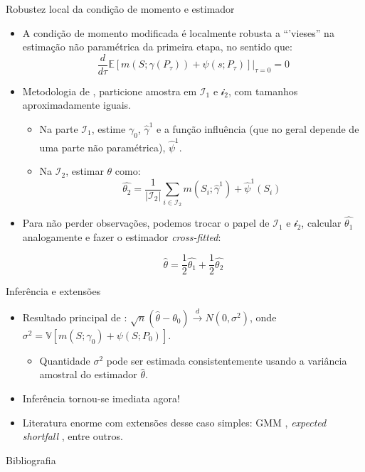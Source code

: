 \documentclass[11pt]{beamer}
\begin{document}
\begin{frame}{Robustez local da condição de momento e estimador}
\begin{itemize}
	\item A condição de momento modificada é localmente robusta a ``'vieses'' na estimação não paramétrica da primeira etapa, no sentido que:
	$$\frac{d}{d \tau} \mathbb{E}[m(S;\gamma(P_{\tau})) + \psi(s;P_{\tau})]\Big|_{\tau=0} = 0$$
	\item Metodologia de \cite{Chernozhukov2018}, particione amostra em $\mathcal{I}_1$ e $\mathcal{i}_2$, com tamanhos aproximadamente iguais.
	\begin{itemize}
		\item Na parte $\mathcal{I}_1$, estime $\gamma_0$, $\hat{\gamma}^1$ e a função influência (que no geral depende de uma parte não paramétrica), $\hat{\psi}^1$.
		\item Na $\mathcal{I}_2$, estimar $\theta$ como:
		\begin{equation}
			\hat{\theta_2} = \frac{1}{|\mathcal{I}_2|}\sum_{i\in \mathcal{I}_2} m(S_i;\hat{\gamma}^1) + \hat{\psi}^1(S_i)
		\end{equation}
	\end{itemize}
	\item Para não perder observações, podemos trocar o papel de $\mathcal{I}_1$ e $\mathcal{i}_2$, calcular $\hat{\theta_1}$ analogamente e fazer o estimador \textit{cross-fitted}:
	
	$$\hat{\theta} = \frac{1}{2} \hat{\theta_1} + \frac{1}{2} \hat{\theta_2}$$

\end{itemize}
\end{frame}

\begin{frame}{Inferência e extensões}
	\begin{itemize}

		\item Resultado principal de \cite{Chernozhukov2018}: $\sqrt{n}(\hat{\theta} - \theta_0) \overset{d}{\to}N(0, \sigma^2)$, onde $\sigma^2 = \mathbb{V}[m(S;\gamma_0) + \psi(S;P_0)]$.
	\begin{itemize}
		\item Quantidade $\sigma^2$ pode ser estimada consistentemente usando a variância amostral do estimador $\hat{\theta}$.
	\end{itemize}
	\item Inferência tornou-se imediata agora!
	\item Literatura enorme com extensões desse caso simples: GMM \citep{Chernozhukov2018,Chernozhukov2022},  \textit{expected shortfall }\citep{chetverikov2022weightedaverage}, entre outros.
	\end{itemize}
\end{frame}

\begin{frame}[allowframebreaks]{Bibliografia}
	\printbibliography
	
\end{frame}
\end{document}
